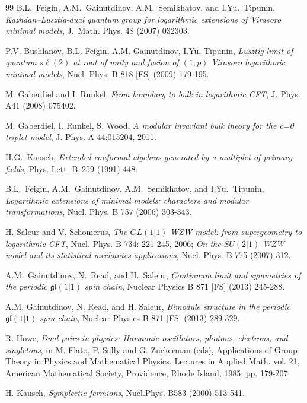\documentclass[11pt]{article}
\newcommand{\gl}{\mathfrak{gl}}
\theoremstyle{definition}
\begin{document}
\begin{thebibliography}{99}
\bibitem{[FGST4]} B.L.~Feigin, A.M.~Gainutdinov, A.M.~Semikhatov, and
    I.Yu.~Tipunin, \textit{Kazhdan--Lusztig-dual quantum group for
    logarithmic extensions of Virasoro minimal models}, J.\ Math.
    Phys. 48 (2007) 032303.

P.V. Bushlanov, B.L. Feigin, A.M. Gainutdinov,
 I.Yu. Tipunin,
\textit{Lusztig limit of quantum $s\ell(2)$ at root of
unity and fusion of $(1,p)$ Virasoro logarithmic minimal models},
 Nucl. Phys. B 818 [FS] (2009) 179-195.

 M. Gaberdiel and I. Runkel,  \textit{From boundary to
bulk in logarithmic CFT}, J. Phys. A41 (2008) 075402.

 M. Gaberdiel, I. Runkel, S. Wood, \textit{A modular invariant bulk theory for the c=0 triplet model}, 	J. Phys. A 44:015204, 2011.

\bibitem{[K-first]} H.G.~Kausch, \textit{Extended conformal algebras
    generated by a multiplet of primary fields}, Phys. Lett. B~259
  (1991) 448.

\bibitem{[FGST3]} B.L.~Feigin, A.M.~Gainutdinov, A.M.~Semikhatov, and
  I.Yu.~Tipunin, \textit{Logarithmic extensions of minimal models:
    characters and modular transformations}, Nucl. Phys. B 757 (2006)
  303-343.

   H. Saleur and V. Schomerus, \textit{The $GL(1|1)$ WZW model: from supergeometry to logarithmic CFT},
  Nucl. Phys. B 734: 221-245, 2006; \textit{On the $SU(2|1)$ WZW model and its statistical mechanics applications}, Nucl. Phys. B 775 (2007) 312.

 A.M.~Gainutdinov, N.~Read, and H.~Saleur,
  \textit{Continuum limit and symmetries  of  the periodic $\gl(1|1)$
    spin chain}, Nuclear Physics B 871 [FS] (2013) 245-288.

 A.M. Gainutdinov, N. Read, and H. Saleur, \textit{Bimodule
  structure in the periodic  $\gl(1|1)$ spin chain}, Nuclear Physics B 871 [FS] (2013) 289-329.

 R. Howe, \textit{Dual pairs in physics: Harmonic oscillators, photons, electrons, and singletons}, in M. Flato,
P. Sally and G. Zuckerman (eds), Applications of Group Theory in Physics and Mathematical Physics,
Lectures in Applied Math. vol. 21, American Mathematical Society, Providence, Rhode Island, 1985,
pp. 179-207.


 H. Kausch, \textit{Symplectic fermions}, Nucl.Phys. B583 (2000) 513-541.


\end{thebibliography}
\end{document}
